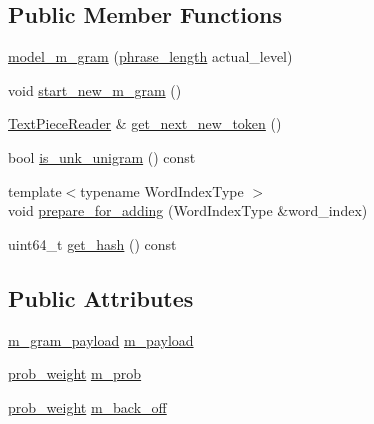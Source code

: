 \subsection*{Public Member Functions}
\begin{DoxyCompactItemize}
\item 
\hyperlink{classuva_1_1smt_1_1bpbd_1_1server_1_1lm_1_1m__grams_1_1model__m__gram_a8a567c654f739ce36458ee07f2f279fd}{model\+\_\+m\+\_\+gram} (\hyperlink{namespaceuva_1_1smt_1_1bpbd_1_1server_af068a19c2e03116caf3e3827a3e40e35}{phrase\+\_\+length} actual\+\_\+level)
\item 
void \hyperlink{classuva_1_1smt_1_1bpbd_1_1server_1_1lm_1_1m__grams_1_1model__m__gram_ad9ee622d6f170d9b149b23f71fe95fdf}{start\+\_\+new\+\_\+m\+\_\+gram} ()
\item 
\hyperlink{classuva_1_1utils_1_1file_1_1_text_piece_reader}{Text\+Piece\+Reader} \& \hyperlink{classuva_1_1smt_1_1bpbd_1_1server_1_1lm_1_1m__grams_1_1model__m__gram_a5c923cb716c8ae1cc80d960a82d025ac}{get\+\_\+next\+\_\+new\+\_\+token} ()
\item 
bool \hyperlink{classuva_1_1smt_1_1bpbd_1_1server_1_1lm_1_1m__grams_1_1model__m__gram_ac77c4bc9c53fbdbb9cfcd0f2bdc1d391}{is\+\_\+unk\+\_\+unigram} () const 
\item 
{\footnotesize template$<$typename Word\+Index\+Type $>$ }\\void \hyperlink{classuva_1_1smt_1_1bpbd_1_1server_1_1lm_1_1m__grams_1_1model__m__gram_aa4d16455853e9440de0f54749dcd73fd}{prepare\+\_\+for\+\_\+adding} (Word\+Index\+Type \&word\+\_\+index)
\item 
uint64\+\_\+t \hyperlink{classuva_1_1smt_1_1bpbd_1_1server_1_1lm_1_1m__grams_1_1model__m__gram_a9b5d37949aac6cab2e914d2ba430b5b5}{get\+\_\+hash} () const 
\end{DoxyCompactItemize}
\subsection*{Public Attributes}
\begin{DoxyCompactItemize}
\item 
\hyperlink{namespaceuva_1_1smt_1_1bpbd_1_1server_1_1lm_1_1m__grams_a1422aa6b3f3cb9377916d20e9bf16c0a}{m\+\_\+gram\+\_\+payload} \hyperlink{classuva_1_1smt_1_1bpbd_1_1server_1_1lm_1_1m__grams_1_1model__m__gram_acc7ca63db888d6daa71662c412398ebd}{m\+\_\+payload}
\item 
\hyperlink{namespaceuva_1_1smt_1_1bpbd_1_1server_a01e9ea4de9c226f4464862e84ff0bbcc}{prob\+\_\+weight} \hyperlink{classuva_1_1smt_1_1bpbd_1_1server_1_1lm_1_1m__grams_1_1model__m__gram_a498a480327f996df10727f2986347d5e}{m\+\_\+prob}
\item 
\hyperlink{namespaceuva_1_1smt_1_1bpbd_1_1server_a01e9ea4de9c226f4464862e84ff0bbcc}{prob\+\_\+weight} \hyperlink{classuva_1_1smt_1_1bpbd_1_1server_1_1lm_1_1m__grams_1_1model__m__gram_a83e71902acec0a069af7622360788790}{m\+\_\+back\+\_\+off}
\end{DoxyCompactItemize}
